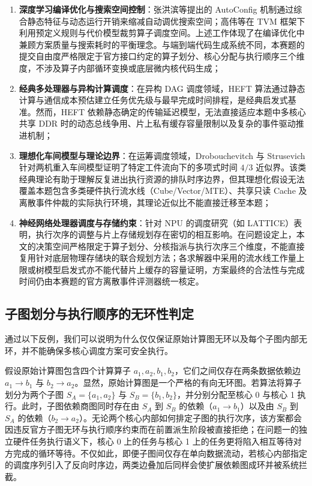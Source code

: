 \documentclass[anonymous,notoc]{gmcm2026}
\providecommand{\tightlist}{\setlength{\itemsep}{0pt}\setlength{\parskip}{0pt}}
\begin{document}
\begin{enumerate}
\def\labelenumi{\arabic{enumi}.}
\tightlist
\item
  \textbf{深度学习编译优化与搜索空间控制}：张洪滨等提出的 AutoConfig 机制\cite{ref13}通过综合静态特征与动态运行开销来缩减自动调优搜索空间；高伟等在 TVM 框架下\cite{ref14}利用预定义规则与代价模型裁剪算子调度空间。上述工作体现了在编译优化中兼顾方案质量与搜索耗时的平衡理念。与端到端代码生成系统不同，本赛题的提交自由度严格限定于官方接口约定的算子划分、核心分配与执行顺序三个维度，不涉及算子内部循环变换或底层微内核代码生成；
\item
  \textbf{经典多处理器与异构计算调度}：在异构 DAG 调度领域，HEFT 算法\cite{ref15}通过静态计算与通信成本预估建立任务优先级与最早完成时间排程，是经典启发式基准。然而，HEFT 依赖静态确定的传输延迟模型，无法直接适应本题中多核心共享 DDR 时的动态总线争用、片上私有缓存容量限制以及复杂的事件驱动推进机制；
\item
  \textbf{理想化车间模型与理论边界}：在运筹调度领域，Drobouchevitch 与 Strusevich 针对两机重入车间模型\cite{ref16}证明了特定工件流向下的多项式时间 \(4/3\) 近似界。该类经典理论有助于理解反复进出执行资源的排队时序边界，但其理想化假设无法覆盖本题包含多类硬件执行流水线（Cube/Vector/MTE）、共享只读 Cache 及离散事件仲裁的实际执行环境，其理论近似比不能直接迁移至本题；
\item
  \textbf{神经网络处理器调度与存储约束}：针对 NPU 的调度研究（如 LATTICE\cite{ref17}）表明，执行次序的调整与片上存储规划存在密切的相互影响。在问题设定上，本文的决策空间严格限定于算子划分、分核指派与执行次序三个维度，不能直接复用针对底层物理存储块的联合规划方法；各求解器中采用的流水线工作量上限或树模型启发式亦不能代替片上缓存的容量证明，方案最终的合法性与完成时间仍由本赛题的官方离散事件评测器统一核定。
\end{enumerate}

\subsection{子图划分与执行顺序的无环性判定}

通过以下反例，我们可以说明为什么仅仅保证原始计算图无环以及每个子图内部无环，并不能确保多核心调度方案可安全执行。

假设原始计算图包含四个计算算子 \(a_1, a_2, b_1, b_2\)，它们之间仅存在两条数据依赖边 \(a_1 \to b_1\) 与 \(b_2 \to a_2\)。显然，原始计算图是一个严格的有向无环图。若算法将算子划分为两个子图 \(S_A = \{a_1, a_2\}\) 与 \(S_B = \{b_1, b_2\}\)，并分别分配至核心 0 与核心 1 执行。此时，子图依赖商图同时存在由 \(S_A\) 到 \(S_B\) 的依赖（\(a_1 \to b_1\)）以及由 \(S_B\) 到 \(S_A\) 的依赖（\(b_2 \to a_2\)）。无论两个核心内部如何排定子图的执行次序，该方案都会因违反官方子图无环与执行顺序约束而在前置派生阶段被直接拒绝；在问题一的独立硬件任务执行语义下，核心 0 上的任务与核心 1 上的任务更将陷入相互等待对方完成的循环等待。不仅如此，即便子图间仅存在单向数据流动，若核心内部指定的调度序列引入了反向时序边，两类边叠加后同样会使扩展依赖图成环并被系统拦截。
\end{document}
